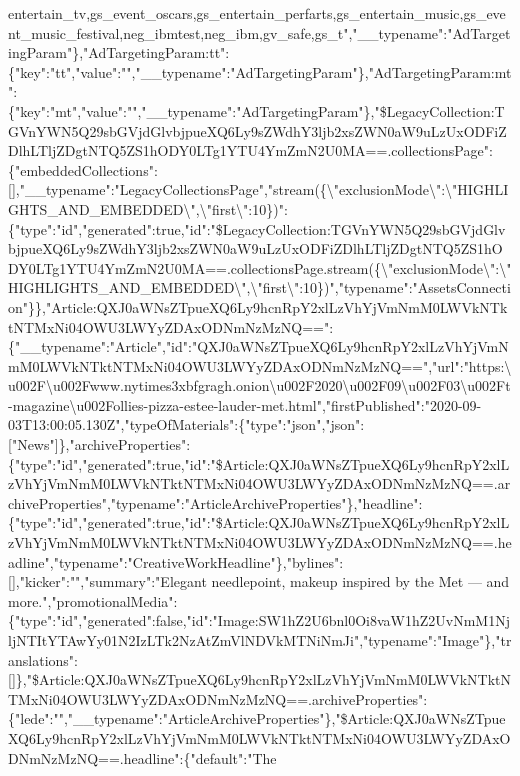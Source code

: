 entertain\_tv,gs\_event\_oscars,gs\_entertain\_perfarts,gs\_entertain\_music,gs\_event\_music\_festival,neg\_ibmtest,neg\_ibm,gv\_safe,gs\_t","\_\_typename":"AdTargetingParam"\},"AdTargetingParam:tt":\{"key":"tt","value":"","\_\_typename":"AdTargetingParam"\},"AdTargetingParam:mt":\{"key":"mt","value":"","\_\_typename":"AdTargetingParam"\},"\$LegacyCollection:TGVnYWN5Q29sbGVjdGlvbjpueXQ6Ly9sZWdhY3ljb2xsZWN0aW9uLzUxODFiZDlhLTljZDgtNTQ5ZS1hODY0LTg1YTU4YmZmN2U0MA==.collectionsPage":\{"embeddedCollections":{[}{]},"\_\_typename":"LegacyCollectionsPage","stream(\{\textbackslash{}"exclusionMode\textbackslash{}":\textbackslash{}"HIGHLIGHTS\_AND\_EMBEDDED\textbackslash{}",\textbackslash{}"first\textbackslash{}":10\})":\{"type":"id","generated":true,"id":"\$LegacyCollection:TGVnYWN5Q29sbGVjdGlvbjpueXQ6Ly9sZWdhY3ljb2xsZWN0aW9uLzUxODFiZDlhLTljZDgtNTQ5ZS1hODY0LTg1YTU4YmZmN2U0MA==.collectionsPage.stream(\{\textbackslash{}"exclusionMode\textbackslash{}":\textbackslash{}"HIGHLIGHTS\_AND\_EMBEDDED\textbackslash{}",\textbackslash{}"first\textbackslash{}":10\})","typename":"AssetsConnection"\}\},"Article:QXJ0aWNsZTpueXQ6Ly9hcnRpY2xlLzVhYjVmNmM0LWVkNTktNTMxNi04OWU3LWYyZDAxODNmNzMzNQ==":\{"\_\_typename":"Article","id":"QXJ0aWNsZTpueXQ6Ly9hcnRpY2xlLzVhYjVmNmM0LWVkNTktNTMxNi04OWU3LWYyZDAxODNmNzMzNQ==","url":"https:\textbackslash{}u002F\textbackslash{}u002Fwww.nytimes3xbfgragh.onion\textbackslash{}u002F2020\textbackslash{}u002F09\textbackslash{}u002F03\textbackslash{}u002Ft-magazine\textbackslash{}u002Follies-pizza-estee-lauder-met.html","firstPublished":"2020-09-03T13:00:05.130Z","typeOfMaterials":\{"type":"json","json":{[}"News"{]}\},"archiveProperties":\{"type":"id","generated":true,"id":"\$Article:QXJ0aWNsZTpueXQ6Ly9hcnRpY2xlLzVhYjVmNmM0LWVkNTktNTMxNi04OWU3LWYyZDAxODNmNzMzNQ==.archiveProperties","typename":"ArticleArchiveProperties"\},"headline":\{"type":"id","generated":true,"id":"\$Article:QXJ0aWNsZTpueXQ6Ly9hcnRpY2xlLzVhYjVmNmM0LWVkNTktNTMxNi04OWU3LWYyZDAxODNmNzMzNQ==.headline","typename":"CreativeWorkHeadline"\},"bylines":{[}{]},"kicker":"","summary":"Elegant
needlepoint, makeup inspired by the Met --- and
more.","promotionalMedia":\{"type":"id","generated":false,"id":"Image:SW1hZ2U6bnl0Oi8vaW1hZ2UvNmM1NjljNTItYTAwYy01N2IzLTk2NzAtZmVlNDVkMTNiNmJi","typename":"Image"\},"translations":{[}{]}\},"\$Article:QXJ0aWNsZTpueXQ6Ly9hcnRpY2xlLzVhYjVmNmM0LWVkNTktNTMxNi04OWU3LWYyZDAxODNmNzMzNQ==.archiveProperties":\{"lede":"","\_\_typename":"ArticleArchiveProperties"\},"\$Article:QXJ0aWNsZTpueXQ6Ly9hcnRpY2xlLzVhYjVmNmM0LWVkNTktNTMxNi04OWU3LWYyZDAxODNmNzMzNQ==.headline":\{"default":"The
